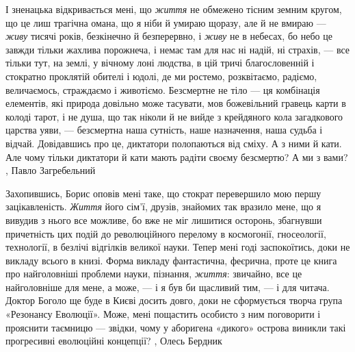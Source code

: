 І зненацька відкривається мені, що \emph{життя} не обмежено тісним земним
кругом, що це лиш трагічна омана, що я ніби й умираю щоразу, але й не вмираю —
\emph{живу} тисячі років, безкінечно й безперервно, і \emph{живу} не в небесах,
бо небо це завжди тільки жахлива порожнеча, і немає там для нас ні надій, ні
страхів, — все тільки тут, на землі, у вічному лоні людства, в цій тричі
благословенній і стократно проклятій обителі і юдолі, де ми ростемо,
розквітаємо, радіємо, величаємось, страждаємо і животіємо.  Безсмертне не тіло
— ця комбінація елементів, які природа довільно може тасувати, мов божевільний
гравець карти в колоді тарот, і не душа, що так ніколи й не вийде з крейдяного
кола загадкового царства уяви, — безсмертна наша сутність, наше назначення,
наша судьба і відчай.  Довідавшись про це, диктатори полопаються від сміху. А з
ними й кати.  Але чому тільки диктатори й кати мають радіти своєму безсмертю? А
ми з вами?
, Павло Загребельний 

Захопившись, Борис оповів мені таке, що стократ перевершило мою першу
зацікавленість. \emph{Життя} його сім’ї, друзів, знайомих так вразило мене, що я
вивудив з нього все можливе, бо вже не міг лишитися осторонь, збагнувши
причетність цих подій до революційного перелому в космогонії, гносеології,
технології, в безлічі відгілків великої науки. Тепер мені годі заспокоїтись,
доки не викладу всього в книзі. Форма викладу фантастична, феєрична, проте це
книга про найголовніші проблеми науки, пізнання, \emph{життя}: звичайно, все це
найголовніше для мене, а може, — і я був би щасливий тим, — і для читача.
Доктор Боголо ще буде в Києві досить довго, доки не сформується творча група
«Резонансу Еволюції». Може, мені пощастить особисто з ним поговорити і
прояснити таємницю — звідки, чому у аборигена «дикого» острова виникли такі
прогресивні еволюційні концепції?
, Олесь Бердник


